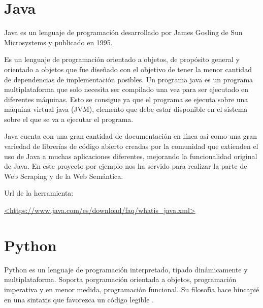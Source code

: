 

\section{Java}

Java es un lenguaje de programación desarrollado por James Gosling de Sun Microsystems y publicado en 1995.

Es un lenguaje de programación orientado a objetos, de propósito general y orientado a objetos que fue diseñado con el objetivo de tener la menor cantidad de dependencias de implementación posibles. Un programa java es un programa multiplataforma que solo necesita ser compilado una vez para ser ejecutado en diferentes máquinas. Esto se consigue ya que el programa se ejecuta sobre una máquina virtual java (JVM), elemento que debe estar disponible en el sistema sobre el que se va a ejecutar el programa.

Java cuenta con una gran cantidad de documentación en línea así como una gran variedad de librerías de código abierto creadas por la comunidad que extienden el uso de Java a muchas aplicaciones diferentes, mejorando la funcionalidad original de Java. En este proyecto por ejemplo nos ha servido para realizar la parte de Web Scraping y de la Web Semántica.

Url de la herramienta:

\url{<https://www.java.com/es/download/faq/whatis_java.xml>}

\section{Python}

Python es un lenguaje de programación  interpretado, tipado dinámicamente y multiplataforma. Soporta porgramación orientada a objetos, programación imperativa y en menor medida, programación funcional. Su filosofía hace hincapié en una sintaxis que favorezca un código legible \cite{wiki:python}.

